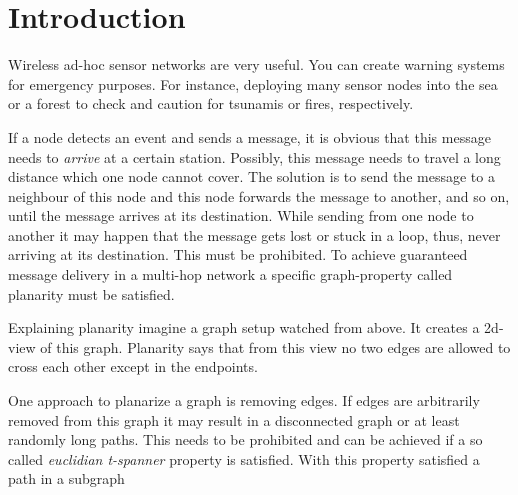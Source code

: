 \section{Introduction}
Wireless ad-hoc sensor networks are very useful. 
You can create warning systems for emergency purposes.
For instance, deploying many sensor nodes into the sea or a forest to check and caution for tsunamis or fires, respectively.

If a node detects an event and sends a message, it is obvious that this message needs to \emph{arrive} at a certain station.
Possibly, this message needs to travel a long distance which one node cannot cover.
The solution is to send the message to a neighbour of this node and this node forwards the message to another, and so on, until the message arrives at its destination.
While sending from one node to another it may happen that the message gets lost or stuck in a loop, thus, never arriving at its destination.
This must be prohibited.
To achieve guaranteed message delivery in a multi-hop network a specific graph-property called planarity must be satisfied.

Explaining planarity imagine a graph setup watched from above. 
It creates a 2d-view of this graph.
Planarity says that from this view no two edges are allowed to cross each other except in the endpoints.

One approach to planarize a graph is removing edges.
If edges are arbitrarily removed from this graph it may result in a disconnected graph or at least randomly long paths.
This needs to be prohibited and can be achieved if a so called \emph{euclidian t-spanner} property is satisfied.
With this property satisfied a path in a subgraph 

